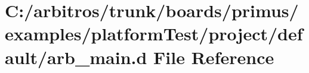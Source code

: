 \hypertarget{boards_2primus_2examples_2platform_test_2project_2default_2arb__main_8d}{\section{C\-:/arbitros/trunk/boards/primus/examples/platform\-Test/project/default/arb\-\_\-main.d File Reference}
\label{boards_2primus_2examples_2platform_test_2project_2default_2arb__main_8d}
}
